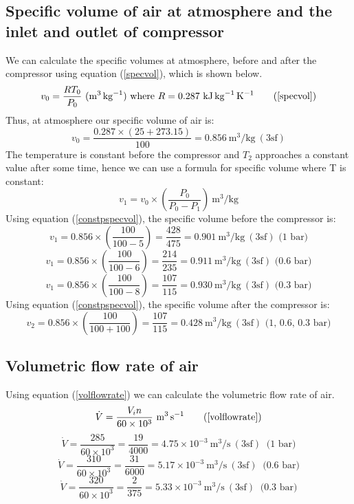 \documentclass[class=article, crop=false, 12pt,a4paper]{standalone}
\begin{document}
\subsection{Specific volume of air at atmosphere and the inlet and outlet of compressor}
We can calculate the specific volumes at atmosphere, before and after the compressor using equation (\ref{specvol}), which is shown below.
\begin{equation}
  v_0 = \frac{RT_0}{P_0} \ (\si{\meter\cubed\per\kg}) \textrm{ where \(R = 0.287 \ \si{\kilo\joule\per\kg\per\kelvin}\)}
  \tag{\ref{specvol}}
\end{equation}
Thus, at atmosphere our specific volume of air is:
\[ v_0 = \frac{0.287 \times (25+273.15)}{100} = 0.856 \ \si{\meter\cubed\per\kg} \ (3\textrm{sf}) \]
The temperature is constant before the compressor and \(T_2\) approaches a constant value after some time, hence we can use a formula for specific volume where T is constant:
\begin{equation}
  v_1 = v_0 \times \left( \frac{P_0}{P_0 - P_1} \right) \ \si{\meter\cubed\per\kg}
  \label{constpspecvol}
\end{equation}
Using equation (\ref{constpspecvol}), the specific volume before the compressor is:
\[ v_1 = 0.856 \times \left( \frac{100}{100-5} \right) = \frac{428}{475} = 0.901 \ \si{\meter\cubed\per\kg} \ (3\textrm{sf}) \textrm{ (1 bar)} \]
\[ v_1 = 0.856 \times \left( \frac{100}{100-6} \right) = \frac{214}{235} = 0.911 \ \si{\meter\cubed\per\kg} \ (3\textrm{sf}) \textrm{ (0.6 bar)} \]
\[ v_1 = 0.856 \times \left( \frac{100}{100-8} \right) = \frac{107}{115} = 0.930 \ \si{\meter\cubed\per\kg} \ (3\textrm{sf}) \textrm{ (0.3 bar)} \]
Using equation (\ref{constpspecvol}), the specific volume after the compressor is:
\[ v_2 = 0.856 \times \left( \frac{100}{100+100} \right) = \frac{107}{115} = 0.428 \ \si{\meter\cubed\per\kg} \ (3\textrm{sf}) \textrm{ (1, 0.6, 0.3 bar)} \]
\subsection{Volumetric flow rate of air}
Using equation (\ref{volflowrate}) we can calculate the volumetric flow rate of air.
\begin{equation}
  \dot{V} = \frac{V_in}{60 \times 10^3} \ \si{\meter\cubed\per\second}
  \tag{\ref{volflowrate}}
\end{equation}
\[ \dot{V} = \frac{285}{60\times 10^3} = \frac{19}{4000} = 4.75 \times 10^{-3} \ \si{\meter\cubed\per\second} \ (3\textrm{sf}) \ \textrm{ (1 bar)}\]
\[ \dot{V} = \frac{310}{60\times 10^3} = \frac{31}{6000} = 5.17 \times 10^{-3} \ \si{\meter\cubed\per\second} \ (3\textrm{sf}) \ \textrm{ (0.6 bar)}\]
\[ \dot{V} = \frac{320}{60\times 10^3} = \frac{2}{375} = 5.33 \times 10^{-3} \ \si{\meter\cubed\per\second} \ (3\textrm{sf}) \ \textrm{ (0.3 bar)}\]
\end{document}
